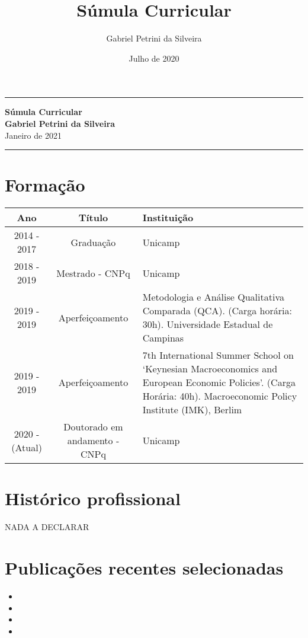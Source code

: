 \documentclass[11pt,a4paper]{article}
\author{Gabriel Petrini da Silveira}
\title{Súmula Curricular}
\date{Julho de 2020}
\begin{document}
\begin{center}
	\rule{\textwidth}{1.2pt}
	\textbf{Súmula Curricular}\\
	\Large\textbf{Gabriel Petrini da Silveira}\\
	Janeiro de 2021
	\rule{\textwidth}{1.2pt}
\end{center}

\section{Formação}

\begin{center}
\begin{tabularx}{\textwidth}{c|c|X}
	\hline \hline 
	\textbf{Ano} & \textbf{Título} & \textbf{Instituição} \\ 
	\hline 
	2014 - 2017 & Graduação & Unicamp \\ \hline 
	2018 - 2019 & Mestrado - CNPq & Unicamp \\ \hline 
	2019 - 2019 & Aperfeiçoamento & Metodologia e Análise Qualitativa Comparada (QCA). (Carga horária: 30h). Universidade Estadual de Campinas\\ \hline
	2019 - 2019 & Aperfeiçoamento &  7th International Summer School on `Keynesian Macroeconomics and European Economic Policies'. (Carga Horária: 40h). Macroeconomic Policy Institute
	(IMK), Berlim \\ \hline
	2020 - (Atual) & Doutorado em andamento - CNPq & Unicamp \\ 
	\hline \hline 
\end{tabularx} 
\end{center}

\section{Histórico profissional}

NADA A DECLARAR


\section{Publicações recentes selecionadas}


\begin{itemize}
	\item {}
	\item {}
	\item {}
	\item {}
\end{itemize}
	
\end{document}
